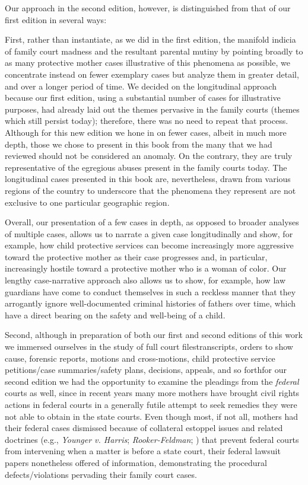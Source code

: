 Our approach in the second edition, however, is distinguished from
that of our first edition in several ways: \pfl{}

First, rather than instantiate, as we did in the first edition, the 
manifold indicia of family court madness and the resultant parental mutiny
by pointing broadly to as many protective mother cases illustrative of
this phenomena as possible, we concentrate instead on fewer exemplary
cases but analyze them in greater detail, and over a longer period of time.
We decided on the longitudinal approach because our first edition, using
a substantial number of cases for illustrative purposes, had already laid
out the themes pervasive in the family courts (themes which still persist
today); therefore, there was no need to repeat that process. Although for
this new edition we hone in on fewer cases, albeit in much more depth,
those we chose to present in this book from the many that we had 
reviewed should not be considered an anomaly. On the contrary, they are
truly representative of the egregious abuses present in the family courts
today. The longitudinal cases presented in this book are, nevertheless,
drawn from various regions of the country to underscore that the 
phenomena they represent are not exclusive to one particular geographic
region. \pfl{}

Overall, our presentation of a few cases in depth, as opposed to
broader analyses of multiple cases, allows us to narrate a given 
case longitudinally and show, for example, how child protective services can
become increasingly more aggressive toward the protective mother as
their case progresses and, in particular, increasingly hostile toward a
protective mother who is a woman of color. Our lengthy case-narrative
approach also allows us to show, for example, how law guardians have
come to conduct themselves in such a reckless manner that they 
arrogantly ignore well-documented criminal histories of fathers over time,
which have a direct bearing on the safety and well-being of a child. \pfl{}

Second, although in preparation of both our first and second editions of this work we immersed ourselves in the study of full court
files\mdash{}transcripts, orders to show cause, forensic reports, motions and
cross-motions, child protective service petitions/case summaries/safety
plans, decisions, appeals, and so forth\mdash{}for our second edition we had
the opportunity to examine the pleadings from the \textit{federal} courts as
well, since in recent years many more mothers have brought civil
rights actions in federal courts in a generally futile attempt to seek remedies
they were not able to obtain in the state courts. Even though most, if
not all, mothers had their federal cases dismissed because of collateral estoppel issues and related  doctrines (e.g., \textit{Younger v. Harris};
\textit{Rooker-Feldman}; ) that prevent federal
courts from intervening when a matter is before a state court, their
federal lawsuit papers nonetheless offered  of information,
demonstrating the procedural defects/violations pervading their family
court cases. \pfl{}

